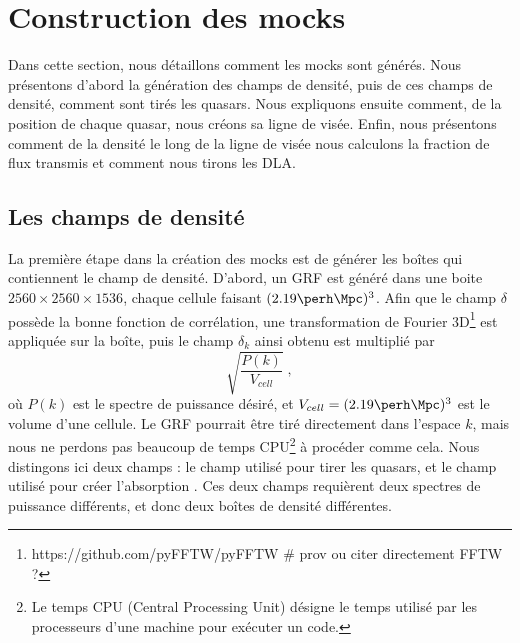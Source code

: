 \documentclass[11pt, twoside, a4paper, openright]{report}
\begin{document}
\section{Construction des mocks}
Dans cette section, nous détaillons comment les mocks sont générés. Nous présentons d'abord la génération des champs de densité, puis de ces champs de densité, comment sont tirés les quasars. Nous expliquons ensuite comment, de la position de chaque quasar, nous créons sa ligne de visée. Enfin, nous présentons comment de la densité le long de la ligne de visée nous calculons la fraction de flux transmis et comment nous tirons les DLA.


\subsection{Les champs de densité}
La première étape dans la création des mocks est de générer les boîtes qui contiennent le champ de densité. D'abord, un GRF est généré dans une boite $\num{2560}\times\num{2560}\times\num{1536}$, chaque cellule faisant $(\num{2.19} \si{\perh\Mpc})^3$.
Afin que le champ $\delta$ possède la bonne fonction de corrélation, une transformation de Fourier 3D\footnote{https://github.com/pyFFTW/pyFFTW \# prov ou citer directement FFTW ?} est appliquée sur la boîte, puis le champ $\delta_k$ ainsi obtenu est multiplié par
\begin{equation}
  \sqrt{\frac{P(k)}{V_{cell}}} \; ,
\end{equation}
où $P(k)$ est le spectre de puissance désiré, et $V_{cell} = (\num{2.19} \si{\perh\Mpc})^3$ est le volume d'une cellule.
Le GRF pourrait être tiré directement dans l'espace $k$, mais nous ne perdons pas beaucoup de temps CPU\footnote{Le temps CPU (Central Processing Unit) désigne le temps utilisé par les processeurs d'une machine pour exécuter un code.} à procéder comme cela.
Nous distingons ici deux champs : le champ utilisé pour tirer les quasars, et le champ utilisé pour créer l'absorption \lya{}. Ces deux champs requièrent deux spectres de puissance différents, et donc deux boîtes de densité différentes.
\end{document}
